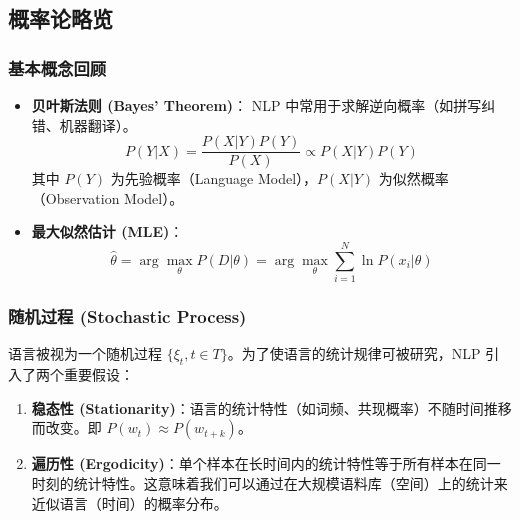 \documentclass[a4paper, 11pt]{ctexart}
\begin{document}
\subsection{概率论略览}

\subsubsection{基本概念回顾}
\begin{itemize}
    \item \textbf{贝叶斯法则 (Bayes' Theorem)}：
    NLP 中常用于求解逆向概率（如拼写纠错、机器翻译）。
    $$ P(Y|X) = \frac{P(X|Y)P(Y)}{P(X)} \propto P(X|Y)P(Y) $$
    其中 $P(Y)$ 为先验概率（Language Model），$P(X|Y)$ 为似然概率（Observation Model）。
    
    \item \textbf{最大似然估计 (MLE)}：
    $$ \hat{\theta} = \arg\max_{\theta} P(D|\theta) = \arg\max_{\theta} \sum_{i=1}^N \ln P(x_i|\theta) $$
\end{itemize}

\subsubsection{随机过程 (Stochastic Process)}
语言被视为一个随机过程 $\{\xi_t, t \in T\}$。为了使语言的统计规律可被研究，NLP 引入了两个重要假设：
\begin{enumerate}
    \item \textbf{稳态性 (Stationarity)}：语言的统计特性（如词频、共现概率）不随时间推移而改变。即 $P(w_t) \approx P(w_{t+k})$。
    \item \textbf{遍历性 (Ergodicity)}：单个样本在长时间内的统计特性等于所有样本在同一时刻的统计特性。这意味着我们可以通过在大规模语料库（空间）上的统计来近似语言（时间）的概率分布。
\end{enumerate}

\end{document}
